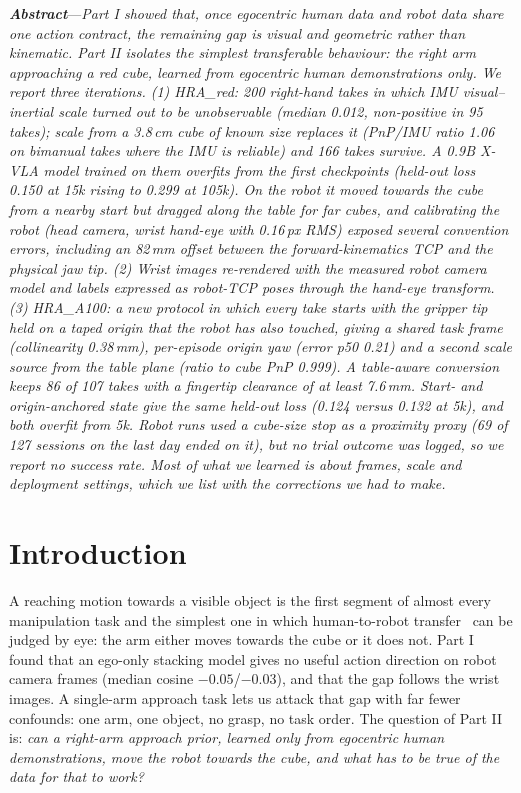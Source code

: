 \documentclass[conference,10pt]{IEEEtran}
\newcommand{\mm}{\,mm\xspace}
\newcommand{\partabstract}[1]{\noindent\textbf{\textit{Abstract}}---\textit{#1}\par\medskip}
\begin{document}
\partabstract{Part I showed that, once egocentric human data and robot data share one action contract, the remaining gap is visual and
geometric rather than kinematic. Part II isolates the simplest transferable behaviour: the right arm approaching a red cube,
learned from egocentric human demonstrations only. We report three iterations. (1) HRA\_red: 200 right-hand takes in which
IMU visual--inertial scale turned out to be unobservable (median 0.012, non-positive in 95 takes); scale from a 3.8\,cm cube
of known size replaces it (PnP/IMU ratio 1.06 on bimanual takes where the IMU is reliable) and 166 takes survive. A 0.9B X-VLA
model trained on them overfits from the first checkpoints (held-out loss 0.150 at 15k rising to 0.299 at 105k). On the robot
it moved towards the cube from a nearby start but dragged along the table for far cubes, and calibrating the robot
(head camera, wrist hand-eye with 0.16\,px RMS) exposed several convention errors, including an 82\mm offset between the
forward-kinematics TCP and the physical jaw tip. (2) Wrist images re-rendered with the measured robot camera model and
labels expressed as robot-TCP poses through the hand-eye transform. (3) HRA\_A100: a new protocol in which every take starts
with the gripper tip held on a taped origin that the robot has also touched, giving a shared task frame (collinearity
0.38\mm), per-episode origin yaw (error p50 0.21\textdegree) and a second scale source from the table plane (ratio to cube
PnP 0.999). A table-aware conversion keeps 86 of 107 takes with a fingertip clearance of at least 7.6\mm. Start- and
origin-anchored state give the same held-out loss (0.124 versus 0.132 at 5k), and both overfit from 5k. Robot runs used a
cube-size stop as a proximity proxy (69 of 127 sessions on the last day ended on it), but no trial outcome was logged, so we
report no success rate. Most of what we learned is about frames, scale and deployment settings, which we list with the
corrections we had to make.}
\section{Introduction}\label{p2:sec:intro}
A reaching motion towards a visible object is the first segment of almost every manipulation task and the simplest one in which human-to-robot transfer~\cite{kareer2024egomimic} can be judged by eye: the arm either moves towards the cube or it does not. Part I found that an
ego-only stacking model gives no useful action direction on robot camera frames (median cosine $-0.05$/$-0.03$), and that the
gap follows the wrist images. A single-arm approach task lets us attack that gap with far fewer confounds: one arm, one object,
no grasp, no task order. The question of Part II is: \emph{can a right-arm approach prior, learned only from egocentric human
demonstrations, move the robot towards the cube, and what has to be true of the data for that to work?}
\end{document}

